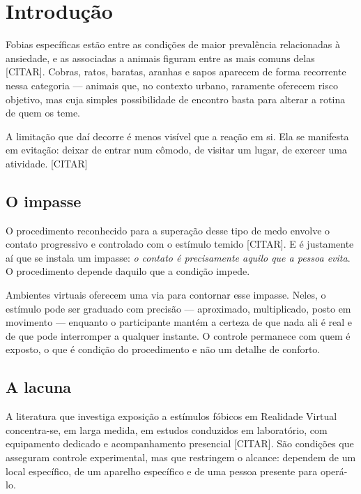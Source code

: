 \section{Introdução}


Fobias específicas estão entre as condições de maior prevalência
relacionadas à ansiedade, e as associadas a animais figuram entre as mais
comuns delas [CITAR]. Cobras, ratos, baratas, aranhas e sapos aparecem de
forma recorrente nessa categoria --- animais que, no contexto urbano,
raramente oferecem risco objetivo, mas cuja simples possibilidade de
encontro basta para alterar a rotina de quem os teme.

A limitação que daí decorre é menos visível que a reação em si. Ela se
manifesta em evitação: deixar de entrar num cômodo, de visitar um lugar,
de exercer uma atividade. [CITAR]

\subsection*{O impasse}

O procedimento reconhecido para a superação desse tipo de medo envolve o
contato progressivo e controlado com o estímulo temido [CITAR]. E é
justamente aí que se instala um impasse: \emph{o contato é precisamente
aquilo que a pessoa evita}. O procedimento depende daquilo que a
condição impede.

Ambientes virtuais oferecem uma via para contornar esse impasse. Neles, o
estímulo pode ser graduado com precisão --- aproximado, multiplicado,
posto em movimento --- enquanto o participante mantém a certeza de que
nada ali é real e de que pode interromper a qualquer instante. O controle
permanece com quem é exposto, o que é condição do procedimento e não um
detalhe de conforto.

\subsection*{A lacuna}

A literatura que investiga exposição a estímulos fóbicos em Realidade
Virtual concentra-se, em larga medida, em estudos conduzidos em
laboratório, com equipamento dedicado e acompanhamento presencial
[CITAR]. São condições que asseguram controle experimental, mas que
restringem o alcance: dependem de um local específico, de um aparelho
específico e de uma pessoa presente para operá-lo.

